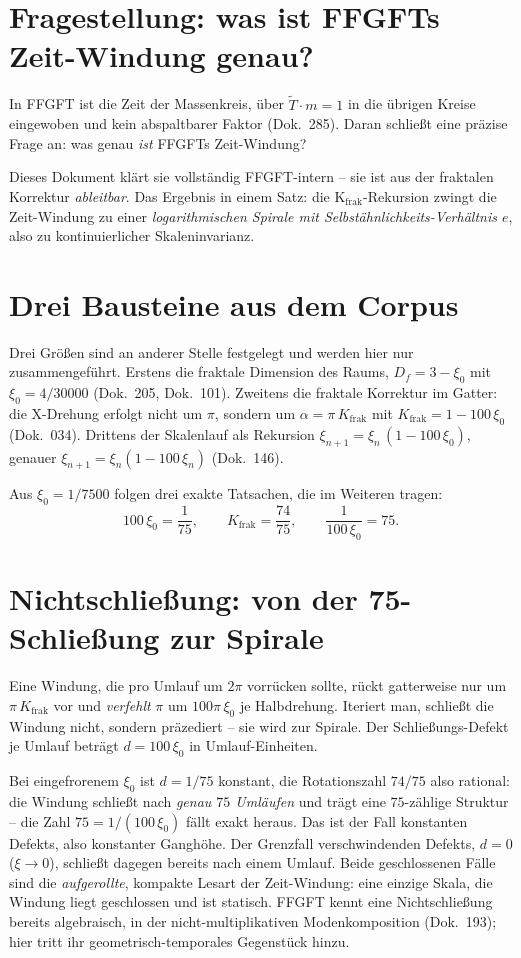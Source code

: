 \section{Fragestellung: was ist FFGFTs Zeit-Windung genau?}
In FFGFT ist die Zeit der Massenkreis, über $\tilde T\cdot m=1$ in die übrigen Kreise eingewoben
und kein abspaltbarer Faktor (Dok.~285). Daran schließt eine präzise Frage an: was genau
\emph{ist} FFGFTs Zeit-Windung?

Dieses Dokument klärt sie vollständig FFGFT-intern -- sie ist aus der fraktalen Korrektur
\emph{ableitbar}. Das Ergebnis in einem Satz: die K$_{\text{frak}}$-Rekursion zwingt die
Zeit-Windung zu einer \emph{logarithmischen Spirale mit Selbstähnlichkeits-Verhältnis $e$}, also
zu kontinuierlicher Skaleninvarianz.

\section{Drei Bausteine aus dem Corpus}
Drei Größen sind an anderer Stelle festgelegt und werden hier nur zusammengeführt. Erstens die
fraktale Dimension des Raums, $D_f=3-\xi_0$ mit $\xi_0=4/30000$ (Dok.~205, Dok.~101).
Zweitens die fraktale Korrektur im Gatter: die X-Drehung erfolgt nicht um $\pi$, sondern um
$\alpha=\pi\,K_{\text{frak}}$ mit $K_{\text{frak}}=1-100\,\xi_0$ (Dok.~034). Drittens der
Skalenlauf als Rekursion $\xi_{n+1}=\xi_n\,(1-100\,\xi_0)$, genauer
$\xi_{n+1}=\xi_n(1-100\,\xi_n)$ (Dok.~146).

Aus $\xi_0=1/7500$ folgen drei exakte Tatsachen, die im Weiteren tragen:
\begin{equation}
  100\,\xi_0=\frac{1}{75},\qquad K_{\text{frak}}=\frac{74}{75},\qquad
  \frac{1}{100\,\xi_0}=75 .
\end{equation}

\section{Nichtschließung: von der 75-Schließung zur Spirale}
Eine Windung, die pro Umlauf um $2\pi$ vorrücken sollte, rückt gatterweise nur um
$\pi\,K_{\text{frak}}$ vor und \emph{verfehlt} $\pi$ um $100\pi\,\xi_0$ je Halbdrehung.
Iteriert man, schließt die Windung nicht, sondern präzediert -- sie wird zur Spirale. Der
Schließungs-Defekt je Umlauf beträgt $d=100\,\xi_0$ in Umlauf-Einheiten.

Bei eingefrorenem $\xi_0$ ist $d=1/75$ konstant, die Rotationszahl $74/75$ also rational: die
Windung schließt nach \emph{genau $75$ Umläufen} und trägt eine $75$-zählige Struktur -- die
Zahl $75=1/(100\,\xi_0)$ fällt exakt heraus. Das ist der Fall konstanten Defekts, also
konstanter Ganghöhe. Der Grenzfall verschwindenden Defekts, $d=0$ ($\xi\to0$), schließt
dagegen bereits nach einem Umlauf. Beide
geschlossenen Fälle sind die \emph{aufgerollte}, kompakte Lesart der Zeit-Windung: eine einzige
Skala, die Windung liegt geschlossen und ist statisch. FFGFT
kennt eine Nichtschließung bereits algebraisch, in der nicht-multiplikativen Modenkomposition
(Dok.~193); hier tritt ihr geometrisch-temporales Gegenstück hinzu.

